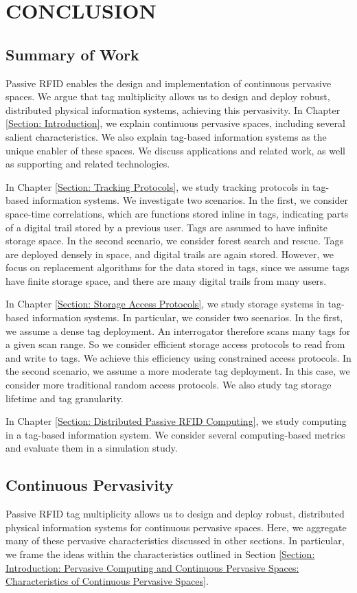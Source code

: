 \chapter{CONCLUSION}
\label{Section: Conclusion}

\section{Summary of Work}
Passive RFID enables the design and implementation of continuous pervasive spaces. We argue that tag multiplicity allows us to design and deploy robust, distributed physical information systems, achieving this pervasivity. In Chapter \ref{Section: Introduction}, we explain continuous pervasive spaces, including several salient characteristics. We also explain tag-based information systems as the unique enabler of these spaces. We discuss applications and related work, as well as supporting and related technologies.

In Chapter \ref{Section: Tracking Protocols}, we study tracking protocols in tag-based information systems. We investigate two scenarios. In the first, we consider space-time correlations, which are functions stored inline in tags, indicating parts of a digital trail stored by a previous user. Tags are assumed to have infinite storage space. In the second scenario, we consider forest search and rescue. Tags are deployed densely in space, and digital trails are again stored. However, we focus on replacement algorithms for the data stored in tags, since we assume tags have finite storage space, and there are many digital trails from many users.

In Chapter \ref{Section: Storage Access Protocols}, we study storage systems in tag-based information systems. In particular, we consider two scenarios. In the first, we assume a dense tag deployment. An interrogator therefore scans many tags for a given scan range. So we consider efficient storage access protocols to read from and write to tags. We achieve this efficiency using constrained access protocols. In the second scenario, we assume a more moderate tag deployment. In this case, we consider more traditional random access protocols. We also study tag storage lifetime and tag granularity.

In Chapter \ref{Section: Distributed Passive RFID Computing}, we study computing in a tag-based information system. We consider several computing-based metrics and evaluate them in a simulation study.

\section{Continuous Pervasivity}
Passive RFID tag multiplicity allows us to design and deploy robust, distributed physical information systems for continuous pervasive spaces. Here, we aggregate many of these pervasive characteristics discussed in other sections. In particular, we frame the ideas within the characteristics outlined in Section \ref{Section: Introduction: Pervasive Computing and Continuous Pervasive Spaces: Characteristics of Continuous Pervasive Spaces}.

